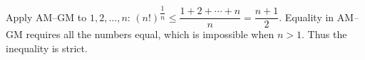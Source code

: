 Apply AM--GM to $1,2,\ldots,n$: $(n!)^{\dfrac{1}{n}} \le \dfrac{1+2+\cdots+n}{n} = \dfrac{n+1}{2}$. Equality in AM--GM requires all the numbers equal, which is impossible when $n>1$. Thus the inequality is strict.
